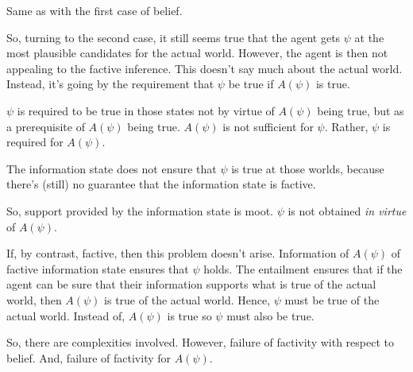 \documentclass[10pt]{article}
\begin{document}
\begin{note}
Same as with the first case of belief.

So, turning to the second case, it still seems true that the agent gets \(\psi\) at the most plausible candidates for the actual world.
However, the agent is then not appealing to the factive inference.
This doesn't say much about the actual world.
Instead, it's going by the requirement that \(\psi\) be true if \(A(\psi)\) is true.

\(\psi\) is required to be true in those states not by virtue of \(A(\psi)\) being true, but as a prerequisite of \(A(\psi)\) being true.
\(A(\psi)\) is not sufficient for \(\psi\).
Rather, \(\psi\) is required for \(A(\psi)\).

The information state does not ensure that \(\psi\) is true at those worlds, because there's (still) no guarantee that the information state is factive.

So, support provided by the information state is moot.
\(\psi\) is not obtained \emph{in virtue} of \(A(\psi)\).

If, by contrast, factive, then this problem doesn't arise.
Information of \(A(\psi)\) of factive information state ensures that \(\psi\) holds.
The entailment ensures that if the agent can be sure that their information supports what is true of the actual world, then \(A(\psi)\) is true of the actual world.
Hence, \(\psi\) must be true of the actual world.
Instead of, \(A(\psi)\) is true so \(\psi\) must also be true.


So, there are complexities involved.
However, failure of factivity with respect to belief.
And, failure of factivity for \(A(\psi)\).
\end{note}
\end{document}
